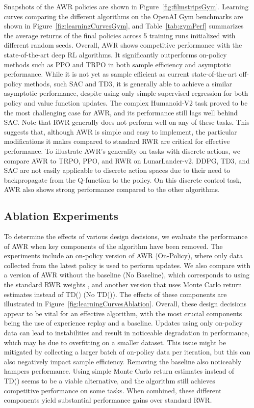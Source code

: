 \documentclass{article} \usepackage{iclr2020_conference,times}
\begin{document}
Snapshots of the AWR policies are shown in Figure~\ref{fig:filmstripsGym}. Learning curves comparing the different algorithms on the OpenAI Gym benchmarks are shown in Figure~\ref{fig:learningCurvesGym}, and Table~\ref{tab:gymPerf} summarizes the average returns of the final policies across 5 training runs initialized with different random seeds. Overall, AWR shows competitive performance with the state-of-the-art deep RL algorithms. It significantly outperforms on-policy methods such as PPO and TRPO in both sample efficiency and asymptotic performance. While it is not yet as sample efficient as current state-of-the-art off-policy methods, such SAC and TD3, it is generally able to achieve a similar asymptotic performance, despite using only simple supervised regression for both policy and value function updates. The complex Humanoid-V2 task proved to be the most challenging case for AWR, and its performance still lags well behind SAC. Note that RWR generally does not perform well on any of these tasks. This suggests that, although AWR is simple and easy to implement, the particular modifications it makes compared to standard RWR are critical for effective performance.
To illustrate AWR's generality on tasks with discrete actions, we compare AWR to TRPO, PPO, and RWR on LunarLander-v2. DDPG, TD3, and SAC are not easily applicable to discrete action spaces due to their need to backpropagate from the Q-function to the policy.
On this discrete control task, AWR also shows strong performance compared to the other algorithms.

\subsection{Ablation Experiments}
To determine the effects of various design decisions, we evaluate the performance of AWR when key components of the algorithm have been removed. The experiments include an on-policy version of AWR (On-Policy), where only data collected from the latest policy is used to perform updates. We also compare with a version of AWR without the baseline  (No Baseline), which corresponds to using the standard RWR weights , and another version that uses Monte Carlo return estimates instead of TD() (No TD()). The effects of these components are illustrated in Figure~\ref{fig:learningCurvesAblation}. Overall, these design decisions appear to be vital for an effective algorithm, with the most crucial components being the use of experience replay and a baseline. Updates using only on-policy data can lead to instabilities and result in noticeable degradation in performance, which may be due to overfitting on a smaller dataset. This issue might be mitigated by collecting a larger batch of on-policy data per iteration, but this can also negatively impact sample efficiency. Removing the baseline also noticeably hampers performance. Using simple Monte Carlo return estimates instead of TD() seems to be a viable alternative, and the algorithm still achieves competitive performance on some tasks. When combined, these different components yield substantial performance gains over standard RWR.
\end{document}
